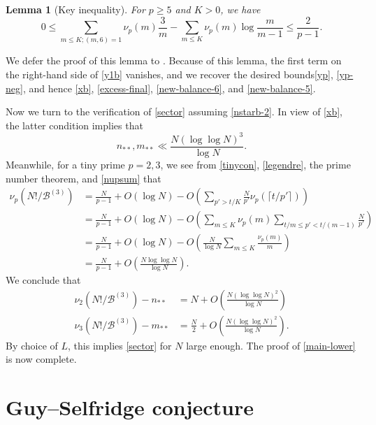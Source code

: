 \documentclass[12pt,a4paper,reqno]{amsart}
\numberwithin{equation}{section}
\theoremstyle{plain}
\newtheorem{lemma}[theorem]{Lemma}
\theoremstyle{definition}
\newcommand\tuple{{\mathcal B}}
\begin{document}
\begin{lemma}[Key inequality]\label{key-ineq} For $p\geq 5$ and $K > 0$, we have
$$ 0 \leq \sum_{m \leq K; (m,6)=1} \nu_p(m) \frac{3}{m} - \sum_{m \leq K} \nu_p(m) \log \frac{m}{m-1} \leq \frac{2}{p-1}.$$
\end{lemma}

We defer the proof of this lemma to . Because
 of this lemma, the first term on the right-hand side of \eqref{y1b} vanishes, and we recover the desired bounds\eqref{yp}, \eqref{yp-neg}, and hence \eqref{xb}, \eqref{excess-final}, \eqref{new-balance-6}, and \eqref{new-balance-5}.

Now we turn to the verification of \eqref{sector} assuming \eqref{nstarb-2}.  In view of \eqref{xb}, the latter condition implies that
$$ n_{**}, m_{**} \ll \frac{N (\log\log N)^3}{\log N}.$$
Meanwhile, for a tiny prime $p=2,3$, we see from \eqref{tinycon}, \eqref{legendre}, the prime number theorem, and \eqref{nupsum} that
\begin{align*}
  \nu_p(N!/\tuple^{(3)}) &= \frac{N}{p-1} + O(\log N) - O\left( \sum_{p' > t/K} \frac{N}{p'} \nu_p\left(\lceil t/p' \rceil\right) \right)\\
  &= \frac{N}{p-1} + O(\log N) - O\left( \sum_{m \leq K} \nu_p(m) \sum_{t/m \leq p' < t/(m-1)} \frac{N}{p'} \right) \\
  &= \frac{N}{p-1} + O(\log N) - O\left( \frac{N}{\log N} \sum_{m \leq K} \frac{\nu_p(m)}{m} \right) \\
  &= \frac{N}{p-1} + O\left( \frac{N \log\log N}{\log N} \right).
\end{align*}
We conclude that
\begin{align*}
   \nu_2(N!/\tuple^{(3)}) - n_{**} &= N + O\left( \frac{N (\log\log N)^2}{\log N} \right)\\
   \nu_3(N!/\tuple^{(3)}) - m_{**} &= \frac{N}{2} + O\left( \frac{N (\log\log N)^2}{\log N} \right).
\end{align*}
By choice of $L$, this implies \eqref{sector} for $N$ large enough.  The proof of \eqref{main-lower} is now complete.

\section{Guy--Selfridge conjecture}
\end{document}
